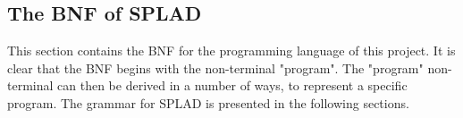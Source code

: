\subsection{The BNF of SPLAD}
\label{sec:bnf}
This section contains the BNF for the programming language of this project. It is clear that the BNF begins with the non-terminal "program". The "program" non-terminal can then be derived in a number of ways, to represent a specific program. The grammar for SPLAD is presented in the following sections.
